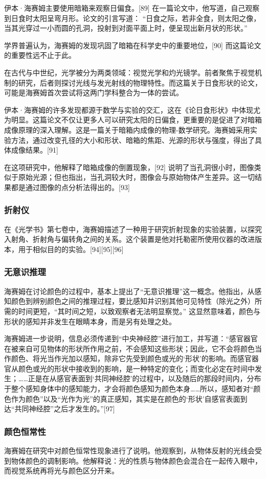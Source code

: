 伊本·海赛姆主要使用暗箱来观察日偏食。[89] 在一篇论文中，他写道，自己观察到日食时太阳呈弯月形。论文的引言写道： “日食之际，若非全食，则太阳之像，当其光穿过一小而圆的孔洞，投射到对面平面上时，便呈现出新月状的形状。”

学界普遍认为，海赛姆的发现巩固了暗箱在科学史中的重要地位，[90] 而这篇论文的重要性远不止于此。

在古代与中世纪，光学被分为两类领域：视觉光学和灼光镜学。前者聚焦于视觉机制的研究，后者则探讨光线与发光射线的物理特性。而这篇关于日食形状的论文，可能是海赛姆首次尝试将这两门学科整合为一体的尝试。

伊本·海赛姆的许多发现都源于数学与实验的交汇，这在《论日食形状》中体现尤为明显。这篇论文不仅让更多人可以研究太阳的日偏食，更重要的是促进了对暗箱成像原理的深入理解。这是一篇关于暗箱内成像的物理-数学研究。海赛姆采用实验方法，通过改变孔径的大小和形状、暗箱的焦距、光源的形状与强度，得出了具体成像结果。[91]

在这项研究中，他解释了暗箱成像的倒置现象，[92] 说明了当孔洞很小时，图像类似于原始光源；但也指出，当孔洞较大时，图像会与原始物体产生差异。这一切结果都是通过图像的点分析法得出的。[93]
\subsubsection{折射仪}
在《光学书》第七卷中，海赛姆描述了一种用于研究折射现象的实验装置，以探究入射角、折射角与偏转角之间的关系。这个装置是他对托勒密所使用仪器的改进版本，用于相似目的的实验。[94][95][96]
\subsubsection{无意识推理}
海赛姆在讨论颜色的过程中，基本上提出了“无意识推理”这一概念。他指出，从感知颜色到辨别颜色之间的推理过程，要比感知并识别其他可见特性（除光之外）所需的时间更短，“其时间之短，以致观察者无法明显察觉。” 这显然意味着，颜色与形状的感知并非发生在眼睛本身，而是另有处理之处。

海赛姆进一步说明，信息必须传递到“中央神经腔”进行加工，并写道：“感官器官在被来自可见物体的形状所作用之前，不会感知这些形状；因此，它不会将颜色当作颜色、将光当作光加以感知，除非它先受到颜色或光的‘形状’的影响。而感官器官从颜色或光的形状中接收到的影响，是一种特定的变化；而变化必定在时间中发生；……正是在从感官表面到‘共同神经腔’的过程中，以及随后的那段时间内，分布于整个感知身体中的感知能力，才会将颜色感知为颜色本身……所以，感知者对“颜色作为颜色”以及“光作为光”的真正感知，其实是在颜色的‘形状’自感官表面到达“共同神经腔”之后才发生的。”[97]
\subsubsection{颜色恒常性}
海赛姆在研究中对颜色恒常性现象进行了说明。他观察到，从物体反射的光线会受到物体颜色的调制影响。他解释说：光的性质与物体颜色会混合在一起传入眼中，而视觉系统再将光与颜色区分开来。

